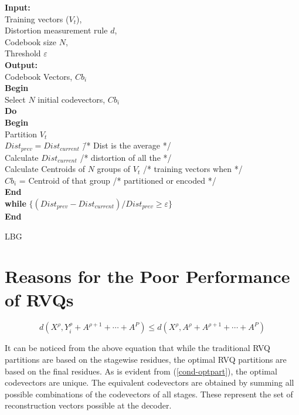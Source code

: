\begin{alg}
\begin{tabbing}
{\bf Input:} \=  \\ 
    \> Training vectors ($V_t$), \\
    \> Distortion measurement rule $d$, \\
    \> Codebook size $N$, \\
    \> Threshold $\varepsilon$ \\
{\bf Output: } \\
 \> Codebook Vectors, $Cb_i$  \\
{\bf Begin} \\
 \> Select $N$ initial codevectors, $Cb_i$  \\
 \> {\bf Do} \= \\
 \> \> {\bf Begin} \= \\
 \> \> \> Partition $V_t$ \\
 \> \> \> $Dist_{prev} = Dist_{current}$ \hspace{1.2in}\=/* Dist is the average */ \\
 \> \> \> Calculate $Dist_{current}$ \> /* distortion of all the */ \\
 \> \> \> Calculate Centroids of $N$ groups of $V_t$ \> /* training vectors when */\\
 \> \> \> $Cb_i$ = Centroid of that group \> /* partitioned or encoded */ \\
 \> \> {\bf End} \\
 \> {\bf while} $\{(Dist_{prev} - Dist_{current})/Dist_{prev} \geq \varepsilon\}$ \\
{\bf End} \\
\end{tabbing}
\caption{LBG}
\label{alg:LBG}
\end{alg}

\section{Reasons for the Poor Performance of RVQs}

\begin{equation}
d(X^{\rho},Y_i^{\rho} + A^{\rho+1}+ \cdots + A^{P}) \leq d(X^{\rho},A^{\rho} + A^{{\rho}+1} + \cdots + A^P)
\label{cond-optpart}
\end{equation}

It can be noticed from the above equation that while the traditional
RVQ partitions are based on the stagewise residues, the optimal RVQ
partitions are based on the final residues. As is evident from
(\ref{cond-optpart}), the optimal codevectors are unique.  The
equivalent codevectors are obtained by summing all possible
combinations of the codevectors of all stages.  These represent the
set of reconstruction vectors possible at the decoder.

